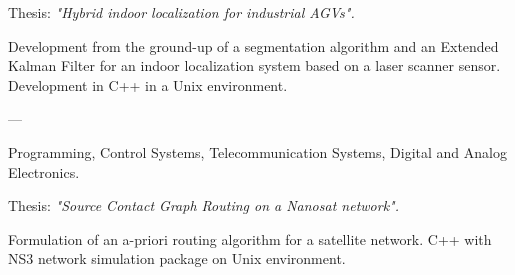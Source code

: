 \documentclass[11 pt,oneside,a4paper,titlepage]{article}
\begin{document}
{\begin{minipage}{11.3cm}
{		Thesis: \emph{"Hybrid indoor localization for industrial AGVs".}

		Development from the ground-up of a segmentation algorithm and an Extended Kalman Filter 
		for an indoor localization system based on a laser scanner sensor. 
		Development in C++ in a Unix environment.
	}
		
	\vspace*{0.22cm}
                                                    {--}{--}
	{
		Programming, Control Systems, Telecommunication Systems, Digital and Analog Electronics.
		
		Thesis: \emph{"Source Contact Graph Routing on a Nanosat network".} 

		Formulation of an a-priori routing algorithm for a satellite network. 
		C++ with NS3 network simulation package on Unix environment.
	}
\end{minipage}} %


\newpage

\end{document}
